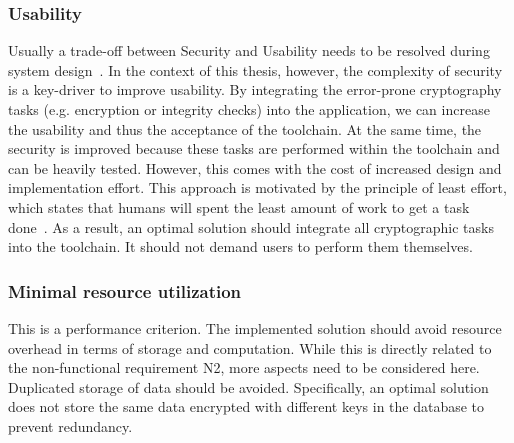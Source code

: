 \documentclass[../main.tex]{subfiles}
\begin{document}
\subsubsection{Usability}
Usually a trade-off between Security and Usability needs to be resolved during system design~.
In the context of this thesis, however, the complexity of security is a key-driver to improve usability. 
By integrating the error-prone cryptography tasks (e.g. encryption or integrity checks) into the application, we can increase the usability and thus the acceptance of the toolchain.
At the same time, the security is improved because these tasks are performed within the toolchain and can be heavily tested.
However, this comes with the cost of increased design and implementation effort.
This approach is motivated by the principle of least effort, which states that humans will spent the least amount of work to get a task done~\cite{Levenson2018}.
As a result, an optimal solution should integrate all cryptographic tasks into the toolchain.
It should not demand users to perform them themselves.

\subsubsection{Minimal resource utilization}
This is a performance criterion.
The implemented solution should avoid resource overhead in terms of storage and computation.
While this is directly related to the non-functional requirement N2, more aspects need to be considered here.
Duplicated storage of data should be avoided.
Specifically, an optimal solution does not store the same data encrypted with different keys in the database to prevent redundancy.
\end{document}
